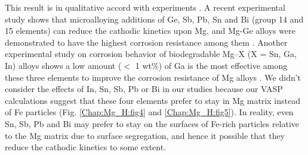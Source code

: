 This result is in qualitative accord with experiments \cite{liu2016controlling,birbilis2014evidence}. A recent experimental study shows that microalloying additions of Ge, Sb, Pb, Sn and Bi (group 14 and 15 elements) can reduce the cathodic kinetics upon Mg, and Mg-Ge alloys were demonstrated to have the highest corrosion resistance among them \cite{liu2018simultaneously}. Another experimental study on corrosion behavior of biodegradable Mg–X (X = Sn, Ga, In) alloys shows a low amount ($<$ 1 wt$\%$) of Ga is the most effective among these three elements to improve the corrosion resistance of Mg alloys \cite{kubasek2013structure}. We didn't consider the effects of In, Sn, Sb, Pb or Bi in our studies because our \ac{VASP} calculations suggest that these four elements prefer to stay in Mg matrix instead of Fe particles (Fig. \ref{Chap:Mg_H:fig4} and \ref{Chap:Mg_H:fig5}). In reality, even Sn, Sb, Pb and Bi may prefer to stay on the surfaces of Fe-rich particles relative to the Mg matrix due to surface segregation, and hence it possible that they reduce the cathodic kinetics to some extent.

